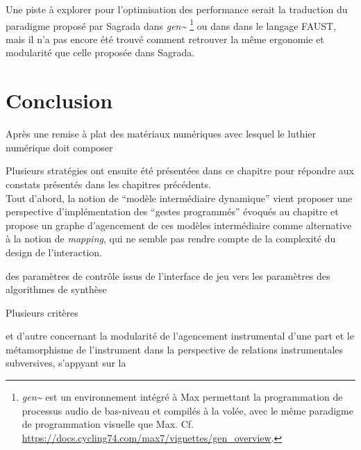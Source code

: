 \indent Une piste à explorer pour l'optimisation des performance serait la traduction du paradigme proposé par Sagrada dans \textit{gen\textasciitilde{ }}\footnote{\textit{gen\textasciitilde{ }} est un environnement intégré à Max permettant la programmation de processus audio de bas-niveau et compilés à la volée, avec le même paradigme de programmation visuelle que Max. Cf. \url{https://docs.cycling74.com/max7/vignettes/gen_overview}.} ou dans dans le langage \gls{FAUST}, mais il n'a pas encore été trouvé comment retrouver la même ergonomie et modularité que celle proposée dans Sagrada.


\section{Conclusion}

\noindent Après une remise à plat des matériaux numériques avec lesquel le luthier numérique doit composer 

\noindent Plusieurs stratégies ont ensuite été présentées dans ce chapitre pour répondre aux constats présentés dans les chapitres précédents.\\
\indent Tout d'abord, la notion de ``modèle intermédiaire dynamique'' vient proposer une perspective d'implémentation des ``gestes programmés'' évoqués au chapitre \label{ch:gesture} et propose un graphe d'agencement de ces modèles intermédiaire comme alternative à la notion de \textit{mapping}, qui ne semble pas rendre compte de la complexité du design de l'interaction.

des paramètres de contrôle issus de l'interface de jeu vers les paramètres des algorithmes de synthèse 


Plusieurs critères 

et d'autre 
  concernant la modularité de l'agencement instrumental d'une part et le métamorphisme de l'instrument dans la perspective de relations instrumentales subversives, s'appyant sur la  





